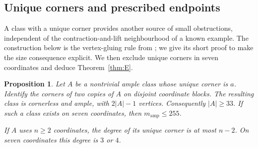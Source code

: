 \documentclass[11pt]{article}
\numberwithin{equation}{section}
\newtheorem{proposition}[theorem]{Proposition}
\theoremstyle{definition}
\theoremstyle{remark}
\newcommand{\mamp}{m_{\mathrm{amp}}}
\begin{document}
\subsection{Unique corners and prescribed endpoints}
\label{sec:unique-corner-search}

A class with a unique corner provides another source of small
obstructions, independent of the contraction-and-lift neighbourhood of a
known example. The construction below is the vertex-gluing rule from
\cite{BousquetDampReader}; we give its short proof to make the size
consequence explicit. We then exclude unique corners in seven coordinates
and deduce Theorem~\ref{thm:E}.

\begin{proposition}
\label{prop:unique-corner-double}
Let $A$ be a nontrivial ample class whose unique corner is $a$.
Identify the corners of two copies of $A$ on disjoint coordinate blocks.
The resulting class is cornerless and ample, with $2|A|-1$ vertices.
Consequently $|A|\ge33$. If such a class exists on seven coordinates,
then $\mamp\le255$.

If $A$ uses $n\ge2$ coordinates, the degree of its unique corner is
at most $n-2$. On seven coordinates this degree is $3$ or $4$.
\end{proposition}
\end{document}
